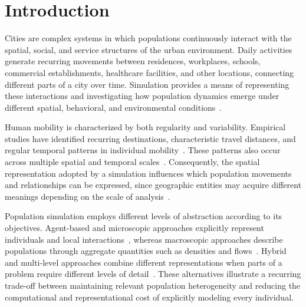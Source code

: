 \chapter{Introduction}
\label{chapter:introduction}

Cities are complex systems in which populations continuously interact with the spatial, social, and service structures of the urban environment. Daily activities generate recurring movements between residences, workplaces, schools, commercial establishments, healthcare facilities, and other locations, connecting different parts of a city over time. Simulation provides a means of representing these interactions and investigating how population dynamics emerge under different spatial, behavioral, and environmental conditions~\cite{eid1980,mather2019walkability,Javed2022}.

Human mobility is characterized by both regularity and variability. Empirical studies have identified recurring destinations, characteristic travel distances, and regular temporal patterns in individual mobility~\cite{brockmann2006scaling,gonzalez2008understanding,natureSong2010exploration}. These patterns also occur across multiple spatial and temporal scales~\cite{natureAlessandretti2017multiScaleSpatioTemporal,alessandretti2020nature}. Consequently, the spatial representation adopted by a simulation influences which population movements and relationships can be expressed, since geographic entities may acquire different meanings depending on the scale of analysis~\cite{naturePaasi2004placeAndRegion,natureBatty2006hierarchy,naturePumain2006hierarchy}.

Population simulation employs different levels of abstraction according to its objectives. Agent-based and microscopic approaches explicitly represent individuals and local interactions~\cite{macal2010agentBasedTutorial,helbing1995social,van2011reciprocal,de2012simulating}, whereas macroscopic approaches describe populations through aggregate quantities such as densities and flows~\cite{hughes2002continuum,treuille2006continuum}. Hybrid and multi-level approaches combine different representations when parts of a problem require different levels of detail~\cite{xiong2010hybrid,ijaz2015hybridSurvey,antonitsch2019bioclouds,serana2023multilevelmodeling}. These alternatives illustrate a recurring trade-off between maintaining relevant population heterogeneity and reducing the computational and representational cost of explicitly modeling every individual.

